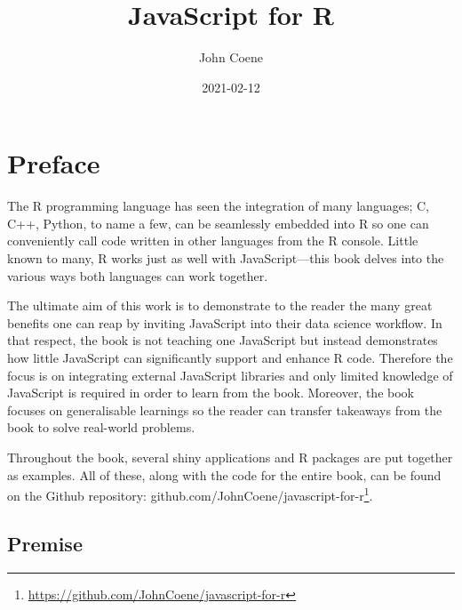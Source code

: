 \documentclass[10pt,]{krantz}
\title{JavaScript for R}
\author{John Coene}
\date{2021-02-12}
\renewcommand{\href}[2]{#2\footnote{\url{#1}}}
\begin{document}
\maketitle


\thispagestyle{empty}

\begin{center}
\end{center}

\setlength{\abovedisplayskip}{-5pt}
\setlength{\abovedisplayshortskip}{-5pt}

{
\hypersetup{linkcolor=}
\setcounter{tocdepth}{2}
\tableofcontents
}
\listoftables
\listoffigures
\hypertarget{preface}{%
\chapter*{Preface}\label{preface}}


The R programming language has seen the integration of many languages; C, C++, Python, to name a few, can be seamlessly embedded into R so one can conveniently call code written in other languages from the R console. Little known to many, R works just as well with JavaScript---this book delves into the various ways both languages can work together.

The ultimate aim of this work is to demonstrate to the reader the many great benefits one can reap by inviting JavaScript into their data science workflow. In that respect, the book is not teaching one JavaScript but instead demonstrates how little JavaScript can significantly support and enhance R code. Therefore the focus is on integrating external JavaScript libraries and only limited knowledge of JavaScript is required in order to learn from the book. Moreover, the book focuses on generalisable learnings so the reader can transfer takeaways from the book to solve real-world problems.

Throughout the book, several shiny applications and R packages are put together as examples. All of these, along with the code for the entire book, can be found on the Github repository: \href{https://github.com/JohnCoene/javascript-for-r}{github.com/JohnCoene/javascript-for-r}.

\hypertarget{premise}{%
\section*{Premise}\label{premise}}
\end{document}

